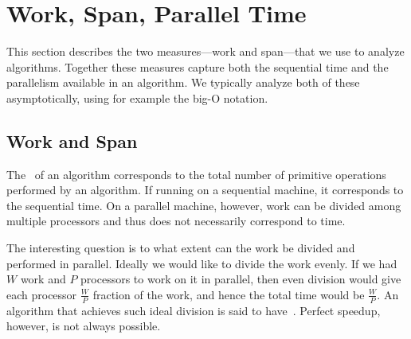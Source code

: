 





\section{Work, Span, Parallel Time}
\label{sec:introduction::parallelism::work-span}

\begin{gram}
This section describes the two measures---work and span---that we use
to analyze algorithms.  Together these measures capture both the
sequential time and the parallelism available in an algorithm.
%
We typically analyze both of these asymptotically, using
for example the big-O notation.
%
\end{gram}

\subsection{Work and Span}

\begin{gram}[Work]
The~ of an algorithm corresponds to the total number of
primitive operations performed by an algorithm.  If running on a
sequential machine, it corresponds to the sequential time.
%
On a parallel machine, however, work can be divided among multiple
processors and thus does not necessarily correspond to time.
%

The interesting question is to what extent can the work be divided and
performed in parallel.  Ideally we would like to divide the work
evenly.  If we had $W$ work and $P$ processors to work on it in
parallel, then even division would give each processor $\frac{W}{P}$
fraction of the work, and hence the total time would be $\frac{W}{P}$.
%
An algorithm that achieves such ideal division is said to
have~.  Perfect speedup, however, is not always
possible.
%
\end{gram}

